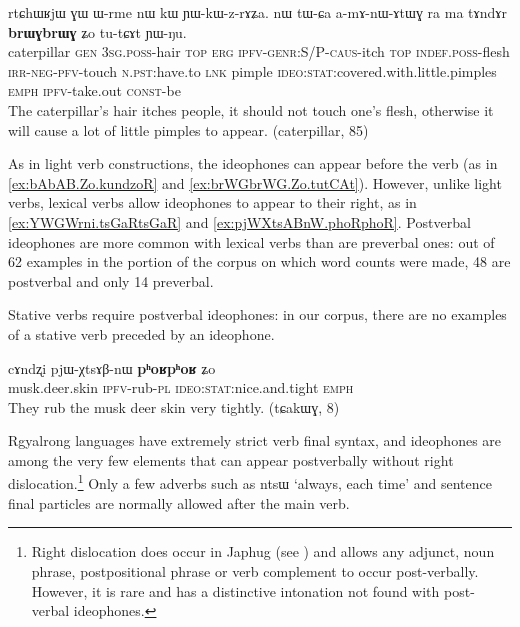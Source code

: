 \documentclass[oldfontcommands,oneside,a4paper,11pt]{article}
\newcommand{\ipa}[1]{{\phon \mbox{#1}}} %
\begin{document}
\begin{exe}
\ex \label{ex:brWGbrWG.Zo.tutCAt}
\gll
\ipa{rtɕhɯʁjɯ}  	\ipa{ɣɯ}  	\ipa{ɯ-rme}  	\ipa{nɯ}  	\ipa{kɯ}  	\ipa{ɲɯ-kɯ-z-rɤʑa.}  	\ipa{nɯ}  	\ipa{tɯ-ɕa}  	\ipa{a-mɤ-nɯ-ɤtɯɣ}  	\ipa{ra}  	\ipa{ma}  	\ipa{tɤndɤr}  	\ipa{\textbf{brɯɣbrɯɣ}}  	\ipa{ʑo}  	\ipa{tu-tɕɤt}  	\ipa{ɲɯ-ŋu.}  \\
caterpillar \textsc{gen} \textsc{3sg.poss}-hair \textsc{top} \textsc{erg} \textsc{ipfv-genr:S/P-caus}-itch \textsc{top} \textsc{indef.poss}-flesh \textsc{irr-neg-pfv}-touch \textsc{n.pst}:have.to \textsc{lnk} pimple \textsc{ideo:stat}:covered.with.little.pimples \textsc{emph} \textsc{ipfv}-take.out \textsc{const}-be \\
\glt The caterpillar's hair itches people, it should not touch one's flesh, otherwise it will cause a lot of little pimples to appear. (caterpillar, 85)
\end{exe}

As in light verb constructions, the ideophones can appear  before the verb (as in \ref{ex:bAbAB.Zo.kundzoR} and \ref{ex:brWGbrWG.Zo.tutCAt}). However, unlike light verbs, lexical verbs allow ideophones to appear to their right, as in \ref{ex:YWGWrni.tsGaRtsGaR} and \ref{ex:pjWXtsABnW.phoRphoR}. Postverbal ideophones are more common with lexical verbs than are preverbal ones: out of 62 examples in the portion of the corpus on which word counts were made, 48 are postverbal and only 14 preverbal. 

Stative verbs require postverbal ideophones: in our corpus, there are no examples of a stative verb preceded by an ideophone. 


 \begin{exe}
\ex \label{ex:pjWXtsABnW.phoRphoR}
\gll 
\ipa{cɤndʐi}  	\ipa{pjɯ-χtsɤβ-nɯ}  	\ipa{\textbf{pʰoʁpʰoʁ}} \ipa{ʑo}\\
musk.deer.skin \textsc{ipfv}-rub-\textsc{pl} \textsc{ideo:stat}:nice.and.tight \textsc{emph}\\
\glt They rub the musk deer skin very tightly. (tɕakɯɣ, 8)
\end{exe}

Rgyalrong languages have extremely strict verb final syntax, and ideophones are among the very few elements that can appear  postverbally without right dislocation.\footnote{Right dislocation does occur in Japhug (see \citealt[207-8]{jacques13harmonization}) and allows any adjunct, noun phrase, postpositional phrase or verb complement to occur post-verbally. However, it is rare and has a distinctive intonation not found with post-verbal ideophones.} Only a few adverbs such as \ipa{ntsɯ} `always, each time' and sentence final particles are normally allowed after the main verb. 
\end{document}
